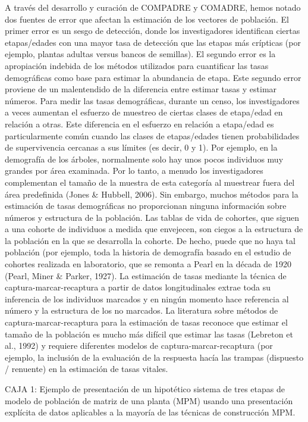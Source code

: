 \documentclass[
  12pt,
  letterpaper,
]{book}
\begin{document}
A través del desarrollo y curación de COMPADRE y COMADRE, hemos notado
dos fuentes de error que afectan la estimación de los vectores de
población. El primer error es un sesgo de detección, donde los
investigadores identifican ciertas etapas/edades con una mayor tasa de
detección que las etapas más crípticas (por ejemplo, plantas adultas
versus bancos de semillas). El segundo error es la apropiación indebida
de los métodos utilizados para cuantificar las tasas demográficas como
base para estimar la abundancia de etapa. Este segundo error proviene de
un malentendido de la diferencia entre estimar tasas y estimar números.
Para medir las tasas demográficas, durante un censo, los investigadores
a veces aumentan el esfuerzo de muestreo de ciertas clases de etapa/edad
en relación a otras. Este diferencia en el esfuerzo en relación a
etapa/edad es particularmente común cuando las clases de etapas/edades
tienen probabilidades de supervivencia cercanas a sus límites (es decir,
0 y 1). Por ejemplo, en la demografía de los árboles, normalmente solo
hay unos pocos individuos muy grandes por área examinada. Por lo tanto,
a menudo los investigadores complementan el tamaño de la muestra de esta
categoría al muestrear fuera del área predefinida (Jones \& Hubbell,
2006). Sin embargo, muchos métodos para la estimación de tasas
demográficas no proporcionan ninguna información sobre números y
estructura de la población. Las tablas de vida de cohortes, que siguen a
una cohorte de individuos a medida que envejecen, son ciegos a la
estructura de la población en la que se desarrolla la cohorte. De hecho,
puede que no haya tal población (por ejemplo, toda la historia de
demografía basado en el estudio de cohortes realizada en laboratorio,
que se remonta a Pearl en la década de 1920 (Pearl, Miner \& Parker,
1927). La estimación de tasas mediante la técnica de
captura-marcar-recaptura a partir de datos longitudinales extrae toda su
inferencia de los individuos marcados y en ningún momento hace
referencia al número y la estructura de los no marcados. La literatura
sobre métodos de captura-marcar-recaptura para la estimación de tasas
reconoce que estimar el tamaño de la población es mucho más difícil que
estimar las tasas (Lebreton et al., 1992) y requiere diferentes modelos
de captura-marcar-recaptura (por ejemplo, la inclusión de la evaluación
de la respuesta hacía las trampas (dispuesto / renuente) en la
estimación de tasas vitales.

CAJA 1: Ejemplo de presentación de un hipotético sistema de tres etapas
de modelo de población de matriz de una planta (MPM) usando una
presentación explícita de datos aplicables a la mayoría de las técnicas
de construcción MPM.
\end{document}
